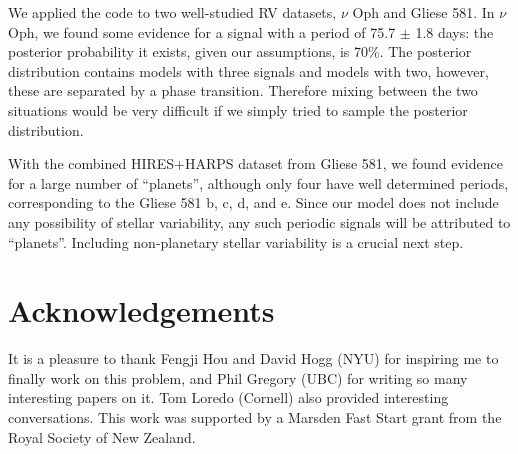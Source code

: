 \documentclass[useAMS,usenatbib]{mn2e}
\begin{document}
We applied the code to two well-studied RV datasets, $\nu$ Oph and Gliese 581.
In $\nu$ Oph, we found some evidence for a signal with a period of
75.7 $\pm$ 1.8 days: the posterior probability it exists, given our assumptions,
is 70\%. The posterior distribution contains models with three signals and
models with two, however, these are separated by a phase transition. Therefore
mixing between the two situations would be very difficult if we simply tried
to sample the posterior distribution.

With the combined HIRES+HARPS dataset from Gliese 581, we found
evidence for a large number of ``planets'', although only four have well
determined periods, corresponding to the Gliese 581 b, c, d,
and e. Since our model does not include any possibility of stellar variability,
any such periodic signals will be attributed to ``planets''.
Including non-planetary stellar variability is a crucial next step.

\vspace{-0.5cm}
\section*{Acknowledgements}
It is a pleasure to thank Fengji Hou and David Hogg (NYU) for inspiring me to
finally work on this problem, and Phil Gregory (UBC) for writing so many
interesting papers on it. Tom Loredo (Cornell) also provided interesting
conversations. This work was supported by a Marsden Fast Start
grant from the Royal Society of
New Zealand.
\end{document}
